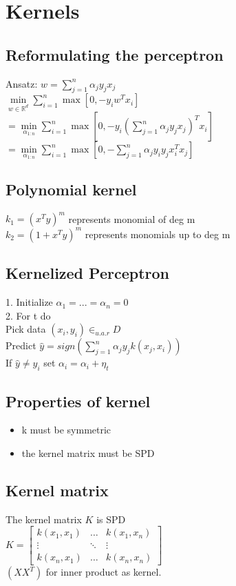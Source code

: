\section*{Kernels}
\subsection*{Reformulating the perceptron}
Ansatz: $w=\sum_{j=1}^n \alpha_j y_j x_j$\\
$\min \limits_{w\in\mathbb{R}^d} \sum_{i=1}^n \max [0, -y_i w^T x_i]$\\
$= \min \limits_{\alpha_{1:n}} \sum_{i=1}^n \max [0,-y_i  ( \sum_{j=1}^n \alpha_j y_j x_j  )^T x_i ]$\\
$= \min \limits_{\alpha_{1:n}} \sum_{i=1}^n \max  [0,- \sum_{j=1}^n \alpha_j y_i y_j x_i^T x_j ]$

\subsection*{Polynomial kernel}
$k_1 = (x^Ty)^m$ represents monomial of deg m \\
$k_2 = (1+x^Ty)^m$ represents monomials up to deg m

\subsection*{Kernelized Perceptron}
1. Initialize $\alpha_1 = ... = \alpha_n = 0$\\
2. For t do \\
Pick data $(x_i,y_i) \in_{u.a.r} D$\\
Predict $\hat{y} = sign(\sum_{j=1}^n \alpha_j y_j k(x_j,x_i))$\\
If $\hat{y} \not = y_i$ set $\alpha_i = \alpha_i + \eta_t$


\subsection*{Properties of kernel}
\begin{itemize}
	\item k must be symmetric
	\item the kernel matrix must be SPD
\end{itemize}

\subsection*{Kernel matrix}
The kernel matrix $K$ is SPD \\
$K = 
\begin{bmatrix}
	k(x_1,x_1) & \dots & k(x_1,x_n) \\
	\vdots & \ddots & \vdots \\
	k(x_n, x_1) & \dots & k(x_n,x_n)
\end{bmatrix}$\\
$\left ( XX^T \right )$ for inner product as kernel.


